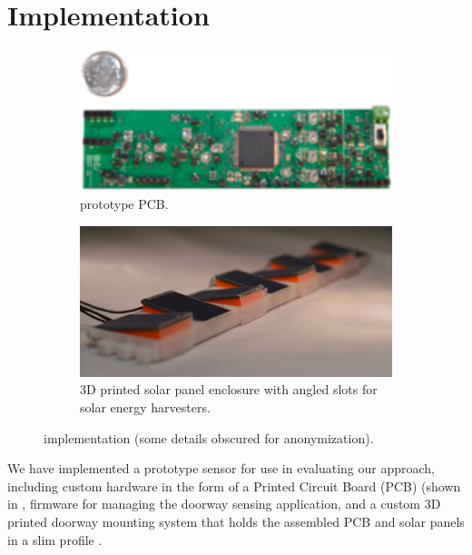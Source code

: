\section{Implementation}
\label{sec:implementation}

\begin{figure}
    \centering
    \begin{subfigure}[t]{\columnwidth}
        \includegraphics[width=\columnwidth]{figs/board_lossy.jpg}
        \caption{ \sysname prototype PCB.}
        \label{fig:pcb}
    \end{subfigure}

    \begin{subfigure}[t]{\columnwidth}
        \includegraphics[width=\columnwidth]{figs/panels_lossy.jpg}
        \caption{3D printed solar panel enclosure with angled slots for solar energy harvesters.}
        \label{fig:mounting}
    \end{subfigure}
    \caption{\sysname implementation (some details obscured for anonymization). \label{fig:prototype}}
\end{figure}

We have implemented a prototype \sysname sensor for use in evaluating our approach, including custom hardware in the form of a Printed Circuit Board (PCB) (shown in , firmware for managing the doorway sensing application, and a custom 3D printed doorway mounting system that holds the assembled PCB and solar panels in a slim profile .


